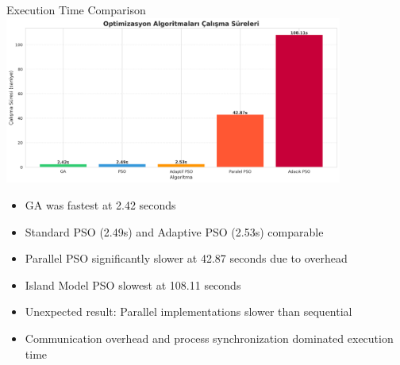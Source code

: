 \documentclass[aspectratio=169,xcolor=table]{beamer}
\begin{document}
\begin{frame}{Execution Time Comparison}
  \centering
  \includegraphics[width=\textwidth, height=5.5cm, keepaspectratio]{execution_times_comparison.png}
  
  \begin{tcolorbox}[
    enhanced,
    colback=blue!5,
    colframe=blue!70,
    arc=2mm,
    title=Performance Analysis,
    fonttitle=\bfseries\large,
    boxrule=0.5mm
  ]
    \begin{itemize}
      \item GA was fastest at 2.42 seconds
      \item Standard PSO (2.49s) and Adaptive PSO (2.53s) comparable
      \item Parallel PSO significantly slower at 42.87 seconds due to overhead
      \item Island Model PSO slowest at 108.11 seconds
      \item Unexpected result: Parallel implementations slower than sequential
      \item Communication overhead and process synchronization dominated execution time
    \end{itemize}
  \end{tcolorbox}
\end{frame}
\end{document}
